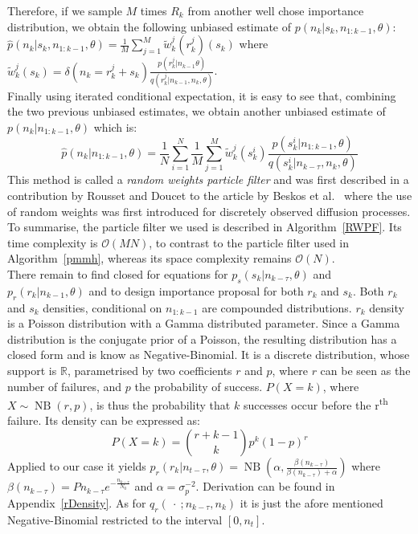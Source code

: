 \documentclass[12pt]{article}
\begin{document}
	Therefore, if we sample $M$ times $R_k$ from another well chose importance distribution, we obtain the following unbiased estimate of $p(n_k |s_k, n_{1:k-1}, \theta)$: $\hat{p}(n_k |s_k, n_{1:k-1}, \theta)=\frac{1}{M}\sum_{j=1}^{M}\tilde{w}_k^j(r_k^j)(s_k)$ where $\tilde{w}_k^j(s_k) =\delta(n_k = r_k^j + s_k)\frac{p(r_k^j|n_{k-1} \theta)}{q(r_k^j|n_{k-1}, n_k, \theta)}$. \\
	Finally using iterated conditional expectation, it is easy to see that, combining the two previous unbiased estimates, we obtain another unbiased estimate of $p(n_k|n_{1:k-1},\theta)$ which is:
	\begin{equation}
	\hat{p}(n_k|n_{1:k-1},\theta) = \frac{1}{N}\sum_{i=1}^{N}\frac{1}{M}\sum_{j=1}^{M}\tilde{w}_k^j(s_k^i)\frac{p(s_k^i|n_{1:k-1}, \theta)}{q(s_k^i|n_{k-\tau}, n_k, \theta)}
	\end{equation}
	This method is called a \emph{random weights particle filter} and was first described in a contribution by Rousset and Doucet to the article by Beskos et al.~\cite{beskos2006exact} where the use of random weights was first introduced for discretely observed diffusion processes.\\
	To summarise, the particle filter we used is described in Algorithm~\ref{RWPF}. Its time complexity is $\mathcal{O}(MN)$, to contrast to the particle filter used in Algorithm~\ref{pmmh}, whereas its space complexity remains $\mathcal{O}(N)$. \\
	
	There remain to find closed for equations for $p_s(s_k|n_{k-\tau}, \theta)$ and $p_r(r_k|n_{k-1}, \theta)$ and to design importance proposal for both $r_k$ and $s_k$. Both $r_k$ and $s_k$ densities, conditional on $n_{1:{k-1}}$ are compounded distributions. $r_k$ density is a Poisson distribution with a Gamma distributed parameter. Since a Gamma distribution is the conjugate prior of a Poisson, the resulting distribution has a closed form and is know as Negative-Binomial. It is a discrete distribution, whose support is $\mathbb{R}$, parametrised by two coefficients $r$ and $p$, where $r$ can be seen as the number of failures, and $p$ the probability of success. $P(X=k)$, where $X\sim \operatorname{NB}(r, p)$, is thus the probability that $k$ successes occur before the r\textsuperscript{th} failure. Its density can be expressed as: 
	\begin{equation*}
	P(X=k) = \binom{r+k-1}{k}p^k(1-p)^r
	\end{equation*}
	Applied to our case it yields $p_r(r_k|n_{t-\tau}, \theta) = \operatorname{NB}(\alpha, \frac{\beta(n_{k-\tau})}{\beta(n_{k-\tau}) + \alpha})$ where  $\beta(n_{k-\tau}) = Pn_{k-\tau}e^{-\frac{n_{k-\tau}}{N_0}}$ and $\alpha = \sigma_p^{-2}$. Derivation can be found in Appendix~\cref{rDensity}.
	As for $q_r(\ \cdot \ ; n_{k-\tau}, n_k)$ it is just the afore mentioned Negative-Binomial restricted to the interval $[0, n_t]$. \\
	
\end{document}
